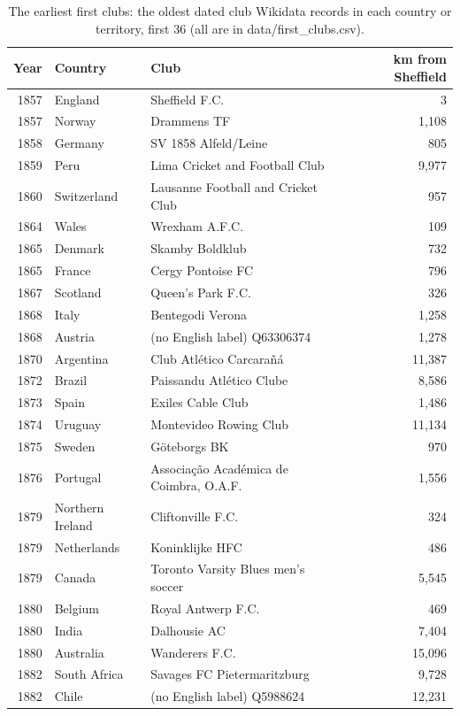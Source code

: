 \documentclass[11pt,a4paper]{article}
\begin{document}
\begin{table}[tbp]\centering\footnotesize\caption{The earliest first clubs: the oldest dated club Wikidata records in each country or territory, first 36 (all are in data/first\_clubs.csv).}\label{tab:first}\begin{tabular}{rl>{\raggedright\arraybackslash}p{7.2cm}r}\toprule Year & Country & Club & km from Sheffield\\\midrule
1857 & England & Sheffield F.C. & 3\\
1857 & Norway & Drammens TF & 1,108\\
1858 & Germany & SV 1858 Alfeld/Leine & 805\\
1859 & Peru & Lima Cricket and Football Club & 9,977\\
1860 & Switzerland & Lausanne Football and Cricket Club & 957\\
1864 & Wales & Wrexham A.F.C. & 109\\
1865 & Denmark & Skamby Boldklub & 732\\
1865 & France & Cergy Pontoise FC & 796\\
1867 & Scotland & Queen's Park F.C. & 326\\
1868 & Italy & Bentegodi Verona & 1,258\\
1868 & Austria & (no English label) Q63306374 & 1,278\\
1870 & Argentina & Club Atlético Carcarañá & 11,387\\
1872 & Brazil & Paissandu Atlético Clube & 8,586\\
1873 & Spain & Exiles Cable Club & 1,486\\
1874 & Uruguay & Montevideo Rowing Club & 11,134\\
1875 & Sweden & Göteborgs BK & 970\\
1876 & Portugal & Associação Académica de Coimbra, O.A.F. & 1,556\\
1879 & Northern Ireland & Cliftonville F.C. & 324\\
1879 & Netherlands & Koninklijke HFC & 486\\
1879 & Canada & Toronto Varsity Blues men's soccer & 5,545\\
1880 & Belgium & Royal Antwerp F.C. & 469\\
1880 & India & Dalhousie AC & 7,404\\
1880 & Australia & Wanderers F.C. & 15,096\\
1882 & South Africa & Savages FC Pietermaritzburg & 9,728\\
1882 & Chile & (no English label) Q5988624 & 12,231\\

\end{tabular}
\end{table}
\end{document}
